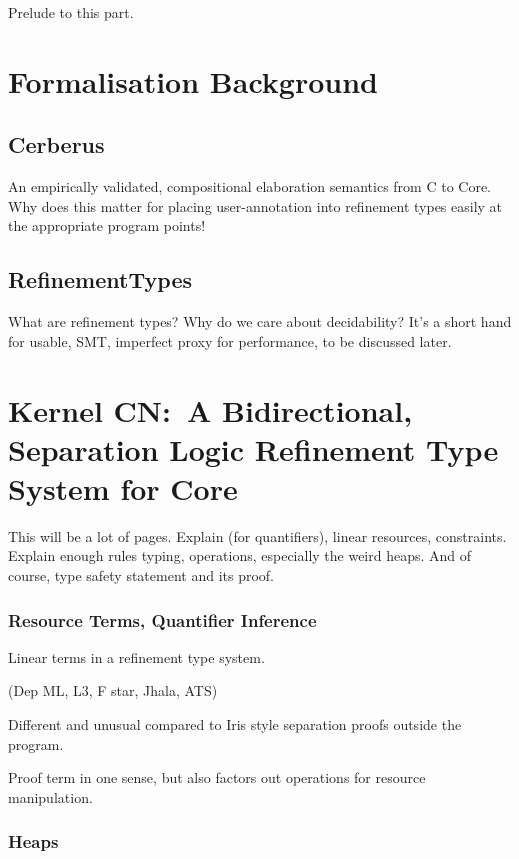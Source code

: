 Prelude to this part.

\chapter{Formalisation Background}%
\label{chap:formal-background}

\section{Cerberus}

An empirically validated, compositional elaboration semantics from C to Core.
Why does this matter \textemdash{} for placing user-annotation into refinement types
easily at the appropriate program points!

\section{RefinementTypes}

What are refinement types? Why do we care about decidability? It's a short hand
for usable, SMT, imperfect proxy for performance, to be discussed later.

\chapter{Kernel CN:\ A Bidirectional, Separation Logic Refinement Type System for Core}%
\label{chap:kernel-cn}

This will be a lot of pages.
Explain  (for quantifiers), linear resources, constraints.
Explain enough rules \textemdash{} typing, operations, especially the weird heaps.
And of course, type safety statement and its proof.

\subsection{Resource Terms, Quantifier Inference}

Linear terms in a refinement type system.

(Dep ML, L3, F star, Jhala, ATS)

Different and unusual compared to Iris style \textemdash{} separation proofs outside the program.

Proof term in one sense, but also factors out operations for resource manipulation.

\subsection{Heaps}


